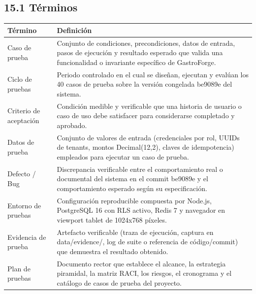 \documentclass[10pt,a4paper]{article}
\newcounter{none}
\begin{document}

\subsection{15.1 Términos}\label{151-tuxe9rminos}

\begingroup\singlespacing\footnotesize\setlength{\parskip}{0pt}

{\def\LTcaptype{none} %
\begin{longtable}[]{@{}
  >{\raggedright\arraybackslash}p{}
  >{\raggedright\arraybackslash}p{}@{}}
\toprule\noalign{}
\begin{minipage}[b]{\linewidth}\raggedright
Término
\end{minipage} & \begin{minipage}[b]{\linewidth}\raggedright
Definición
\end{minipage} \\
\midrule\noalign{}
\endhead
\bottomrule\noalign{}
\endlastfoot
Caso de prueba & Conjunto de condiciones, precondiciones, datos de entrada, pasos de ejecución y resultado esperado que valida una funcionalidad o invariante específico de GastroForge. \\
Ciclo de pruebas & Periodo controlado en el cual se diseñan, ejecutan y evalúan los 40 casos de prueba sobre la versión congelada be9089e del sistema. \\
Criterio de aceptación & Condición medible y verificable que una historia de usuario o caso de uso debe satisfacer para considerarse completado y aprobado. \\
Datos de prueba & Conjunto de valores de entrada (credenciales por rol, UUIDs de tenants, montos Decimal(12,2), claves de idempotencia) empleados para ejecutar un caso de prueba. \\
Defecto / Bug & Discrepancia verificable entre el comportamiento real o documental del sistema en el commit be9089e y el comportamiento esperado según su especificación. \\
Entorno de pruebas & Configuración reproducible compuesta por Node.js, PostgreSQL 16 con RLS activo, Redis 7 y navegador en viewport tablet de 1024x768 píxeles. \\
Evidencia de prueba & Artefacto verificable (traza de ejecución, captura en data/evidence/, log de suite o referencia de código/commit) que demuestra el resultado obtenido. \\
Plan de pruebas & Documento rector que establece el alcance, la estrategia piramidal, la matriz RACI, los riesgos, el cronograma y el catálogo de casos de prueba del proyecto. \\

\end{longtable}}
\end{document}
